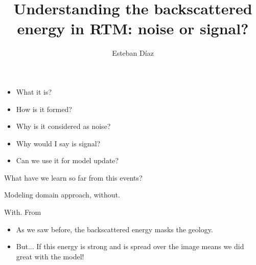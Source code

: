 




\title[]{Understanding the backscattered energy in RTM: noise or signal?}
\subtitle{}
\author[]{Esteban  D\'{i}az}
\date{}
\logo{}

\def\big#1{\begin{center} \LARGE \textbf{#1} \end{center}}
\def\cen#1{\begin{center}        \textbf{#1} \end{center}}

 { \cwpcover }



\begin{frame}
	\begin{itemize}
		\item What it is?  
		\item How is it formed?
		\item Why is it considered as noise?
		\item Why would I say is signal? 
		\item Can we use it for model update?
	\end{itemize}
\end{frame}




\begin{frame}
   What have we learn so far from this events?
\end{frame}

\begin{frame}
Modeling domain approach, without.
\end{frame}

\begin{frame}
With. From ~\cite{fletcher:2049}
\end{frame}


\begin{frame}
	\begin{itemize}
		\item As we saw before, the backscattered energy masks the geology.
		\item But... If this energy is strong and is spread over the image means we did great with the model!
	\end{itemize}
\end{frame}




